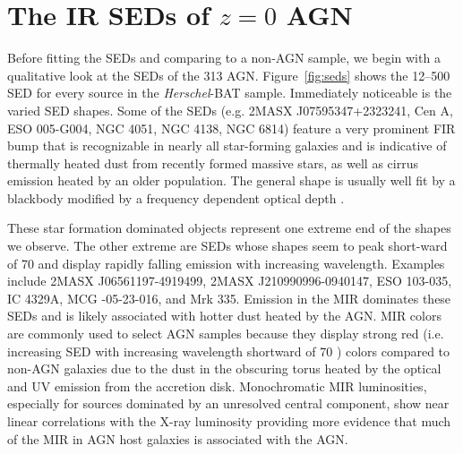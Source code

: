 \documentclass[fleqn, usenatbib]{mnras}
\newcommand{\herschel}{\emph{Herschel}}
\newcommand{\msun}{M$_{\sun}$}
\newcommand{\mstar}{$M_{\mathrm{star}}$}
\begin{document}


\section{The IR SEDs of $z=0$ AGN}\label{sec:ir_seds}

Before fitting the SEDs and comparing to a non-AGN sample, we begin with a qualitative look at the SEDs of the 313 AGN. Figure~\ref{fig:seds} shows the 12--500 \micron{} SED for every source in the \herschel-BAT sample. Immediately noticeable is the varied SED shapes. Some of the SEDs (e.g. 2MASX J07595347+2323241, Cen A, ESO 005-G004, NGC 4051, NGC 4138, NGC 6814) feature a very prominent FIR bump that is recognizable in nearly all star-forming galaxies and is indicative of thermally heated dust from recently formed massive stars, as well as cirrus emission heated by an older population. The general shape is usually well fit by a blackbody modified by a frequency dependent optical depth \citep[e.g.][]{Calzetti:2000fk, Smith:2012fj, Bianchi:2013jk, Symeonidis:2013fe, Cortese:2014qq}.

These star formation dominated objects represent one extreme end of the shapes we observe. The other extreme are SEDs whose shapes seem to peak short-ward of 70 \micron{} and display rapidly falling emission with increasing wavelength. Examples include 2MASX J06561197-4919499, 2MASX J210990996-0940147, ESO 103-035, IC 4329A, MCG -05-23-016, and Mrk 335. Emission in the MIR dominates these SEDs and is likely associated with hotter dust heated by the AGN. MIR colors are commonly used to select AGN samples because they display strong red (i.e. increasing SED with increasing wavelength shortward of 70 \micron) colors compared to non-AGN galaxies \citep{Lacy:2004uq, Donley:2012qy, Stern:2012mz} due to the dust in the obscuring torus heated by the optical and UV emission from the accretion disk. Monochromatic MIR luminosities, especially for sources dominated by an unresolved central component, show near linear correlations with the X-ray luminosity \citep[e.g][]{Lutz:2004fj, Gandhi:2009kx, Asmus:2012qy} providing more evidence that much of the MIR in AGN host galaxies is associated with the AGN. 
\end{document}
